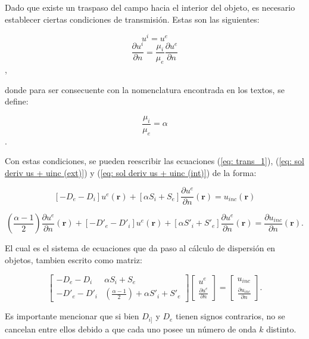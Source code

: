 \documentclass[12pt,letterpaper]{article}
\numberwithin{equation}{section}
\begin{document}
Dado que existe un traspaso del campo hacia el interior del objeto, es necesario establecer ciertas condiciones de transmisión. Estas son las siguientes:

$$u^{i} = u^{e}$$
$$\frac{\partial u^{i}}{\partial n} =\frac{\mu_{i}}{\mu_{e}} \frac{\partial u^{e}}{\partial n}$$,

\noindent donde para ser consecuente con la nomenclatura encontrada en los textos, se define:

$$\frac{\mu_{i}}{\mu_{e}} = \alpha$$.


Con estas condiciones, se pueden reescribir las ecuaciones (\ref{eq: trans_1}), (\ref{eq: sol deriv us + uinc (ext)}) y (\ref{eq: sol deriv us + uinc (int)}) de la forma:

\begin{equation}
\left[-D_{e} - D_{i}\right] u^{e}(\textbf{r}) + \left[\alpha S_{i} + S_{e}\right]\frac{\partial u^{e}}{\partial n}(\textbf{r}) = u_{inc}(\textbf{r}) 
\label{eq: trans_2}		
\end{equation}

\begin{equation}
(\frac{\alpha - 1}{2})\frac{\partial u^{e}}{\partial n}(\textbf{r}) + \left[-D'_{e} - D'_{i}\right] u^{e}(\textbf{r}) + \left[\alpha S'_{i} + S'_{e}\right]\frac{\partial u^{e}}{\partial n}(\textbf{r}) = \frac{\partial u_{inc}}{\partial n}(\textbf{r}).
\label{eq: trans_deriv_2}		
\end{equation}

El cual es el sistema de ecuaciones que da paso al cálculo de dispersión en objetos, tambien escrito como matriz:

\begin{equation} 
\begin{bmatrix}
-D_{e} - D_{i} & \alpha S_{i} + S_{e}\\
-D'_{e} - D'_{i} & (\frac{\alpha - 1}{2})+\alpha S'_{i} + S'_{e}
\end{bmatrix}
\begin{bmatrix}
u^{e}\\
\frac{\partial u^{e}}{\partial n}
\end{bmatrix}
=
\begin{bmatrix}
u_{inc}\\
\frac{\partial u_{inc}}{\partial n}
\end{bmatrix}.
\label{eq:matriz trans}		 
\end{equation} 

Es importante mencionar que si bien $D_{i]}$ y $D_{e}$ tienen signos contrarios, no se cancelan entre ellos debido a que cada uno posee un número de onda $k$ distinto.
\end{document}
